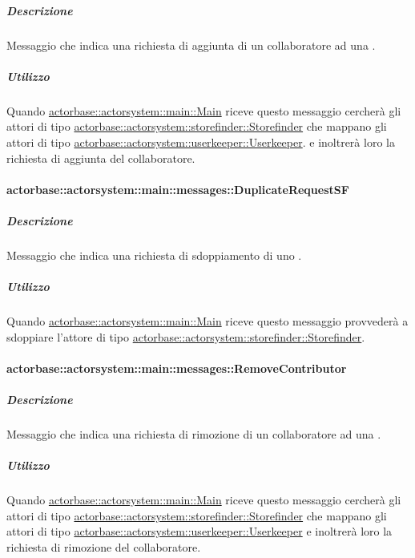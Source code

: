 \documentclass{scalatekids-article}
\begin{document}
\subparagraph{Descrizione}

Messaggio che indica una richiesta di aggiunta di un collaboratore ad una
.

\subparagraph{Utilizzo}

Quando \hyperref[sec:actorbase::actorsystem::main::Main]{actorbase::actorsystem::main::Main}
riceve questo messaggio cercherà gli attori di tipo
\hyperref[sec:actorbase::actorsystem::storefinder::Storefinder]{actorbase::actorsystem::\allowbreak{}storefinder::\allowbreak{}Storefinder}
che mappano gli attori di tipo \hyperref[sec:actorbase::actorsystem::storefinder::Storefinder]{actorbase::actorsystem::\allowbreak{}userkeeper::\allowbreak{}Userkeeper}.
e inoltrerà loro la richiesta di aggiunta del collaboratore.

\paragraph{actorbase::actorsystem::main::messages::DuplicateRequestSF}
\label{sec:actorbase::actorsystem::main::messages::DuplicateRequestSF}

\subparagraph{Descrizione}

Messaggio che indica una richiesta di sdoppiamento di uno .

\subparagraph{Utilizzo}

Quando \hyperref[sec:actorbase::actorsystem::main::Main]{actorbase::actorsystem::main::Main}
riceve questo messaggio provvederà a sdoppiare l'attore di tipo
\hyperref[sec:actorbase::actorsystem::storefinder::Storefinder]{actorbase::actorsystem::\allowbreak{}storefinder::\allowbreak{}Storefinder}.

\paragraph{actorbase::actorsystem::main::messages::RemoveContributor}
\label{sec:actorbase::actorsystem::main::messages::RemoveContributor}

\subparagraph{Descrizione}

Messaggio che indica una richiesta di rimozione di un collaboratore ad una
.

\subparagraph{Utilizzo}

Quando \hyperref[sec:actorbase::actorsystem::main::Main]{actorbase::actorsystem::main::Main}
riceve questo messaggio cercherà gli attori di tipo
\hyperref[sec:actorbase::actorsystem::storefinder::Storefinder]{actorbase::actorsystem::\allowbreak{}storefinder::\allowbreak{}Storefinder}
che mappano gli attori di tipo \hyperref[sec:actorbase::actorsystem::storefinder::Storefinder]{actorbase::actorsystem::\allowbreak{}userkeeper::\allowbreak{}Userkeeper}
e inoltrerà loro la richiesta di rimozione del collaboratore.
\end{document}
